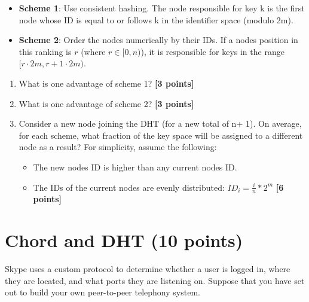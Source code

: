 \documentclass{article}
\begin{document}
\begin{itemize}
\item{\textbf{Scheme 1}: Use consistent hashing. The node responsible for key k is the first node whose ID is equal to or follows k in the identifier space (modulo 2m).}
\item{\textbf{Scheme 2}: Order the nodes numerically by their IDs. If a nodes
position in this ranking is $r$ (where $r \in [0, n)$), it is responsible for
keys in the range $[ r · 2m, r+1 · 2m)$.}
\end{itemize}

\begin{enumerate}
\item{What is one advantage of scheme 1? \textbf{[3 points]}}

\item{What is one advantage of scheme 2? \textbf{[3 points]}}

\item{Consider a new node joining the DHT (for a new total of n+ 1). On
average, for each scheme, what fraction of the key space will be assigned to a
different node as a result? For simplicity, assume the following:
\begin{itemize}
\item{The new nodes ID is higher than any current nodes ID.}
\item{The IDs of the current nodes are evenly distributed: $ID_i = \frac{i}{n}
* 2^m$} \textbf{[6 points]}
\end{itemize}}

\end{enumerate}


\section{Chord and DHT (10 points)}
Skype uses a custom protocol to determine whether a user is logged
in, where they are located, and what ports they are listening on.
Suppose that you have set out to build your own peer-to-peer telephony
system.
\end{document}

